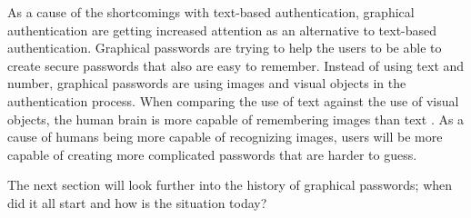   As a cause of the shortcomings with text-based authentication, graphical authentication are getting increased attention as an alternative to text-based authentication. Graphical passwords are trying to help the users to be able to create secure passwords that also are easy to remember. Instead of using text and number, graphical passwords are using images and visual objects in the authentication process. When comparing the use of text against the use of visual objects, the human brain is more capable of remembering images than text \cite{DeAngeli}. As a cause of humans being more capable of recognizing images, users will be more capable of creating more complicated passwords that are harder to guess.

  The next section will look further into the history of graphical passwords; when did it all start and how is the situation today?
  